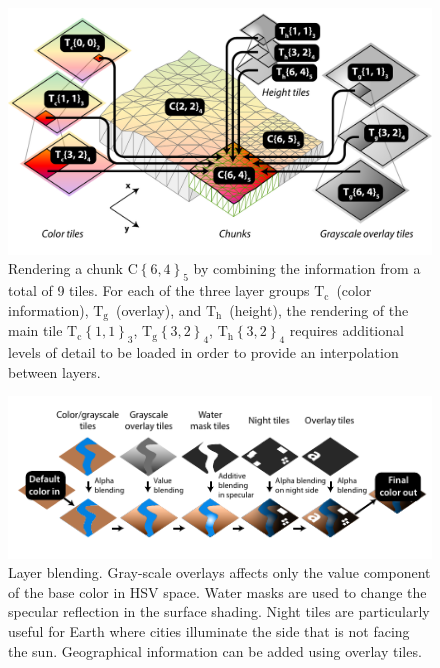 \documentclass[journal]{vgtc}                %
\begin{document}
\begin{figure}
  \centering
    \includegraphics[width=1.0\linewidth]{figures/chunks-and-tiles4.pdf}
  \caption{Rendering a chunk $\textrm{C}\left\{ 6,4 \right\}_5$ by combining the information from a total of 9 tiles. For each of the three layer groups $\textrm{T}_\textrm{c}$~(color information), $\textrm{T}_\textrm{g}$~(overlay), and $\textrm{T}_\textrm{h}$~(height), the rendering of the main tile $\textrm{T}_\textrm{c}\left\{ 1,1 \right\}_3$,  $\textrm{T}_\textrm{g}\left\{ 3,2 \right\}_4$,  $\textrm{T}_\textrm{h}\left\{ 3,2 \right\}_4$ requires additional levels of detail to be loaded in order to provide an interpolation between layers.}\vspace*{-5mm}
  \label{fig:chunks-and-tiles}
\end{figure}


\begin{figure}[b]
  \centering
    \includegraphics[width=1.0\linewidth]{figures/fragment-blending.pdf}
  \caption{Layer blending. Gray-scale overlays affects only the value component of the base color in HSV space. Water masks are used to change the specular reflection in the surface shading. Night tiles are particularly useful for Earth where cities illuminate the side that is not facing the sun. Geographical information can be added using overlay tiles.}
  \label{fig:fragpipe}
\end{figure}
\end{document}
